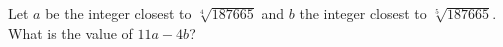 Let $a$ be the integer closest to $\sqrt[4]{187665}$ and $b$ the integer closest to $\sqrt[5]{187665}$. What is the value of $11a-4b$?
